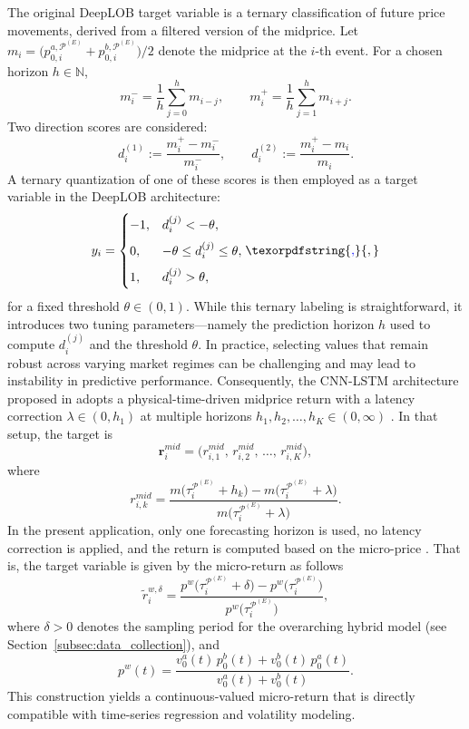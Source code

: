 \documentclass[10pt,a4paper,oneside]{article}
\providecommand{\DIFaddtex}[1]{{\protect\color{blue} \sf #1}} %
\providecommand{\DIFaddbegin}{} %
\providecommand{\DIFaddend}{} %
\providecommand{\DIFadd}[1]{\texorpdfstring{\DIFaddtex{#1}}{#1}} %
\newcommand{\DIFaddincludegraphics}[2][]{{\color{blue}\fbox{\DIFOincludegraphics[#1]{#2}}}} %
\DeclareRobustCommand{\DIFaddbegin}{\DIFOaddbegin \let\includegraphics\DIFaddincludegraphics} %
\DeclareRobustCommand{\DIFaddend}{\DIFOaddend \let\includegraphics\DIFOincludegraphics} %
\begin{document}
The original DeepLOB target variable is a ternary classification of future price movements, derived from a filtered version of the midprice. Let $m_i = \bigl(p^{a, \mathcal{P}^{(E)}}_{0,i} + p^{b, \mathcal{P}^{(E)}}_{0,i}\bigr) / 2$ denote the midprice at the $i$-th event. For a chosen horizon $h \in \mathbb{N}$,
\[
    m_i^- = \frac{1}{h}\sum_{j=0}^{h} m_{i-j},
    \quad\quad
    m_i^+ = \frac{1}{h}\sum_{j=1}^{h} m_{i+j}.
\]
Two direction scores are considered:
\[
    d_i^{(1)} := \frac{m_i^+ - m_i^-}{m_i^-},
    \quad\quad
    d_i^{(2)} := \frac{m_i^+ - m_i}{m_i}.
\]
A ternary quantization of one of these scores is then employed as a target variable in the DeepLOB architecture:
\[
    y_i =
    \begin{cases}
        -1, & d_i^{(j)} < -\theta,              \\[6pt]
        0,  & -\theta \le d_i^{(j)} \le \theta, \\[6pt]
        1,  & d_i^{(j)} > \theta,
    \end{cases}\DIFaddbegin \DIFadd{,
}\DIFaddend \]
for a fixed threshold \(\theta \in (0, 1)\). While this ternary labeling is straightforward, it introduces two tuning parameters—namely the prediction horizon \(h\) used to compute \(d_i^{(j)}\) and the threshold \(\theta\). In practice, selecting values that remain robust across varying market regimes can be challenging and may lead to instability in predictive performance. Consequently, the CNN-LSTM architecture proposed in \cite{kolm2023deep} adopts a physical-time-driven midprice return with a latency correction \(\lambda \in (0, h_1)\) at multiple horizons \(h_1, h_2, \dots, h_K \in (0, \infty)\) . In that setup, the target is
\[
    \mathbf{r}^{mid}_i
    =
    \bigl(r^{mid}_{i, 1},\, r^{mid}_{i, 2},\, \dots,\, r^{mid}_{i, K}\bigr),
\]
where
\[
    r^{mid}_{i, k}
    =
    \frac{m\bigl(\tau^{\mathcal{P}^{(E)}}_i + h_k\bigr)
        - m\bigl(\tau^{\mathcal{P}^{(E)}}_i + \lambda\bigr)}{m\bigl(\tau^{\mathcal{P}^{(E)}}_i + \lambda\bigr)}.
\]
In the present application, only one forecasting horizon is used, no latency correction is applied, and the return is computed based on the micro-price \cite{gatheral2010zero}. That is, the target variable is given by the micro-return as follows
\begin{equation}
    \tilde{r}^{w, \delta}_{i}
    =
    \frac{p^w\bigl(\tau^{\mathcal{P}^{(E)}}_i + \delta\bigr) - p^w\bigl(\tau^{\mathcal{P}^{(E)}}_i\bigr)}{p^w\bigl(\tau^{\mathcal{P}^{(E)}}_i\bigr)},
    \label{eq:micro_ret_cnnlstm}
\end{equation}
where $\delta > 0$ denotes the sampling period for the overarching hybrid model (see Section~\ref{subsec:data_collection}), and
\[
    p^w(t)
    =
    \frac{v^a_0(t)\,p^b_0(t) + v^b_0(t)\,p^a_0(t)}{v^a_0(t) + v^b_0(t)}.
\]
This construction yields a continuous-valued micro-return that is directly compatible with time-series regression and volatility modeling.
\end{document}
